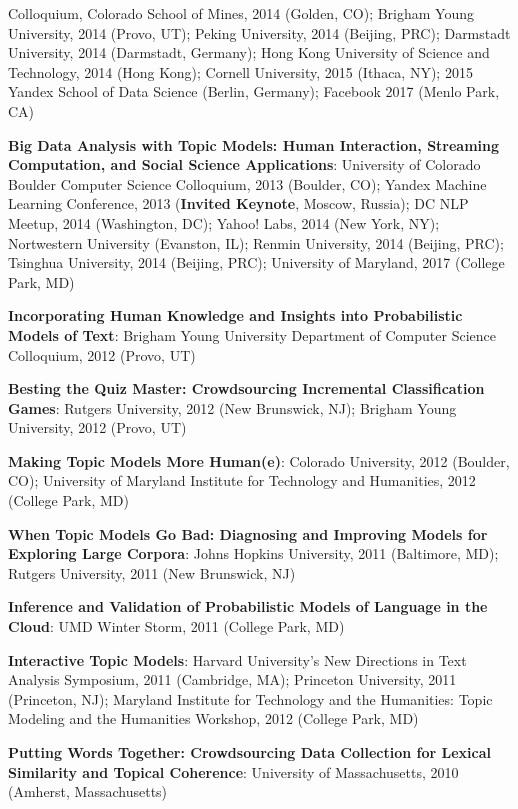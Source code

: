 {{\begin{enumerate*}
Colloquium, Colorado School of Mines, 2014 (Golden, CO); Brigham Young
University, 2014 (Provo, UT); Peking University, 2014 (Beijing, PRC);
Darmstadt University, 2014 (Darmstadt, Germany); Hong Kong University
of Science and Technology, 2014 (Hong Kong); Cornell University, 2015
(Ithaca, NY); 2015 Yandex School of Data Science (Berlin, Germany);
Facebook 2017 (Menlo Park, CA)
	\item {\bf Big Data Analysis with Topic Models: Human
            Interaction, Streaming Computation, and Social Science
            Applications}: University of Colorado Boulder Computer
          Science Colloquium, 2013 (Boulder, CO); Yandex Machine
          Learning Conference, 2013 ({\bf Invited Keynote}, Moscow,
          Russia); DC NLP Meetup, 2014 (Washington, DC); Yahoo! Labs, 2014 (New
          York, NY); Nortwestern University (Evanston, IL); Renmin
          University, 2014 (Beijing, PRC); Tsinghua University, 2014
          (Beijing, PRC); University of Maryland, 2017 (College Park,
          MD)
	\item {\bf Incorporating Human Knowledge and Insights into Probabilistic Models of Text}: Brigham Young University Department of Computer Science Colloquium, 2012 (Provo, UT)
	\item {\bf Besting the Quiz Master: Crowdsourcing Incremental Classification Games}: Rutgers University, 2012 (New Brunswick, NJ); Brigham Young University, 2012 (Provo, UT)
	\item {\bf Making Topic Models More Human(e)}: Colorado University, 2012 (Boulder, CO); University of Maryland Institute for Technology and Humanities, 2012 (College Park, MD)
	\item {\bf When Topic Models Go Bad: Diagnosing and Improving Models for Exploring Large Corpora}: Johns Hopkins University, 2011 (Baltimore, MD); Rutgers University, 2011 (New Brunswick, NJ)
	\item {\bf Inference and Validation of Probabilistic Models of Language in the Cloud}: UMD Winter Storm, 2011 (College Park, MD)
	\item {\bf Interactive Topic Models}: Harvard University's New
          Directions in Text Analysis Symposium, 2011 (Cambridge, MA);
          Princeton University, 2011 (Princeton, NJ); Maryland
          Institute for Technology and the Humanities: Topic Modeling
          and the Humanities Workshop, 2012 (College Park, MD)
	\item {\bf Putting Words Together: Crowdsourcing Data Collection for Lexical Similarity and Topical Coherence}: University of Massachusetts, 2010 (Amherst, Massachusetts)

\end{enumerate*}}}
